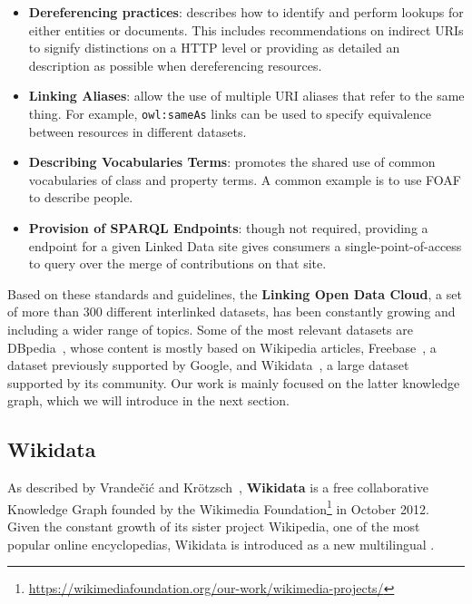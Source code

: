 \begin{itemize}
    \item \textbf{Dereferencing practices}: describes how to identify and perform lookups 
    for either entities or documents. This includes recommendations on indirect URIs to signify 
    distinctions on a HTTP level or providing as detailed an \RDF{} description as possible when 
    dereferencing resources. 
    \item \textbf{Linking Aliases}: allow the use of multiple URI aliases that refer to the same 
    thing. For example, \texttt{owl:sameAs} links can be used to specify equivalence between 
    resources in different datasets.
    \item \textbf{Describing Vocabularies Terms}: promotes the shared use of common vocabularies 
    of class and property terms. A common example is to use FOAF to describe people.
    \item \textbf{Provision of SPARQL Endpoints}: though not required, providing a \SPARQL{} endpoint 
    for a given Linked Data site gives consumers a single-point-of-access to query over the merge 
    of contributions on that site.
\end{itemize} %

Based on these standards and guidelines, the \textbf{Linking Open Data Cloud}, a set of more than 
300 different interlinked \RDF{} datasets, has been constantly growing and including a wider range of 
topics. Some of the most relevant datasets are DBpedia~\cite{KG:dbpedia}, whose content is mostly 
based on Wikipedia articles, Freebase~\cite{KG:freebase}, a dataset previously supported by Google, 
and Wikidata~\cite{KG:wikidata}, a large dataset supported by its community. Our work is mainly 
focused on the latter knowledge graph, which we will introduce in the next section.

\subsection{Wikidata}
\label{cap2:semWeb/wikidata}
As described by Vrandečić and Krötzsch~\cite{KG:wikidata}, \textbf{Wikidata} is a free 
collaborative Knowledge Graph founded by the Wikimedia Foundation\footnote{\url{https://wikimediafoundation.org/our-work/wikimedia-projects/}} 
in October 2012. Given the constant growth of its sister project Wikipedia, one of the most 
popular online encyclopedias, Wikidata is introduced as a new multilingual 
. 

